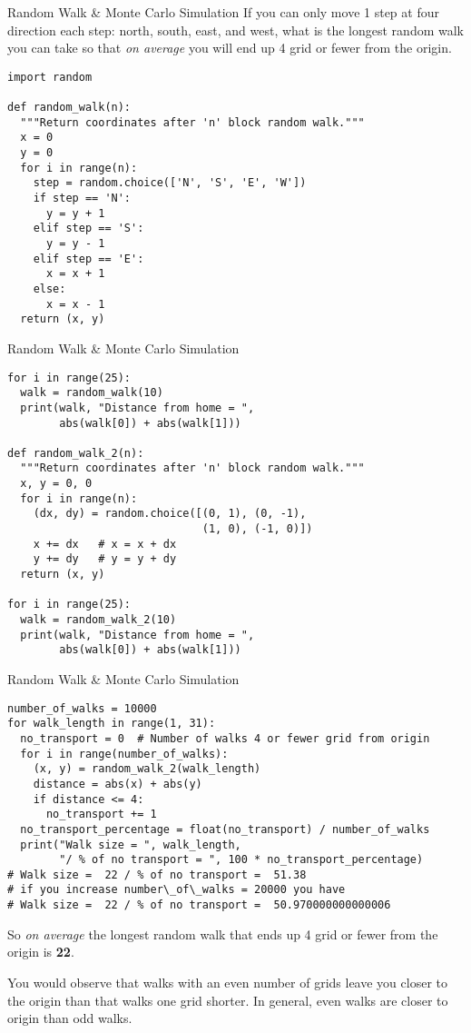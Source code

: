 \documentclass{beamer}
\begin{document}
\begin{frame}[fragile]{Random Walk \& Monte Carlo Simulation} \vspace{1em}
If you can only move 1 step at four direction each step: 
north, south, east, and west, what is the longest random walk 
you can take so that \textit{on average} you will end up 4 
grid or fewer from the origin. \vspace{-.5em}
\begin{verbatim}
import random

def random_walk(n):
  """Return coordinates after 'n' block random walk."""
  x = 0
  y = 0
  for i in range(n):
    step = random.choice(['N', 'S', 'E', 'W'])
    if step == 'N':
      y = y + 1
    elif step == 'S':
      y = y - 1
    elif step == 'E':
      x = x + 1
    else:
      x = x - 1
  return (x, y)
\end{verbatim}
\end{frame}

\begin{frame}[fragile]{Random Walk \& Monte Carlo Simulation}
\begin{verbatim}
for i in range(25):
  walk = random_walk(10)
  print(walk, "Distance from home = ",
        abs(walk[0]) + abs(walk[1]))

def random_walk_2(n):
  """Return coordinates after 'n' block random walk."""
  x, y = 0, 0
  for i in range(n):
    (dx, dy) = random.choice([(0, 1), (0, -1), 
                              (1, 0), (-1, 0)])
    x += dx   # x = x + dx
    y += dy   # y = y + dy
  return (x, y)

for i in range(25):
  walk = random_walk_2(10)
  print(walk, "Distance from home = ",
        abs(walk[0]) + abs(walk[1]))
\end{verbatim}
\end{frame}

\begin{frame}[fragile]{Random Walk \& Monte Carlo Simulation}
\begin{verbatim}
number_of_walks = 10000
for walk_length in range(1, 31):
  no_transport = 0  # Number of walks 4 or fewer grid from origin
  for i in range(number_of_walks):
    (x, y) = random_walk_2(walk_length)
    distance = abs(x) + abs(y)
    if distance <= 4:
      no_transport += 1
  no_transport_percentage = float(no_transport) / number_of_walks
  print("Walk size = ", walk_length,
        "/ % of no transport = ", 100 * no_transport_percentage)
# Walk size =  22 / % of no transport =  51.38
# if you increase number\_of\_walks = 20000 you have
# Walk size =  22 / % of no transport =  50.970000000000006
\end{verbatim}
\scriptsize{So \textit{on average} the longest random walk that 
ends up 4 grid or fewer from the origin is \textbf{22}. \par
You would observe that walks with an even number of grids leave 
you closer to the origin than that walks one grid shorter. In 
general, even walks are closer to origin than odd walks.}
\end{frame}
\end{document}
